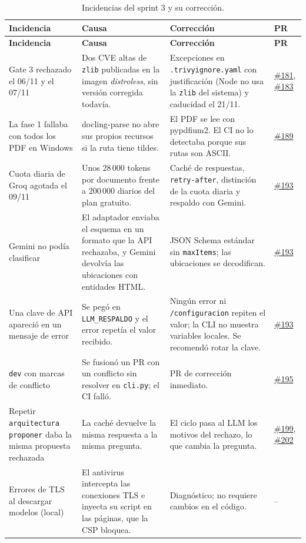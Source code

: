 \documentclass[11pt,a4paper]{report}
\newcommand{\pr}[1]{\href{https://github.com/PracticasESPE/Framework_Desarrollo_Seguro/pull/#1}{\##1}}
\begin{document}
{\small
\begin{longtable}{@{}P{3.3cm}P{4.5cm}P{5.0cm}P{1.2cm}@{}}
\caption{Incidencias del sprint 3 y su corrección.}\\
\toprule
\textbf{Incidencia} & \textbf{Causa} & \textbf{Corrección} & \textbf{PR}\\
\midrule
\endfirsthead
\toprule
\textbf{Incidencia} & \textbf{Causa} & \textbf{Corrección} & \textbf{PR}\\
\midrule
\endhead
Gate 3 rechazado el 06/11 y el 07/11 & Dos CVE altas de \texttt{zlib} publicadas en la imagen \emph{distroless}, sin versión corregida todavía. & Excepciones en \texttt{.trivyignore.yaml} con justificación (Node no usa la \texttt{zlib} del sistema) y caducidad el 21/11. & \pr{181}, \pr{183}\\
La fase 1 fallaba con todos los PDF en Windows & docling-parse no abre sus propios recursos si la ruta tiene tildes. & El PDF se lee con pypdfium2. El CI no lo detectaba porque sus rutas son ASCII. & \pr{189}\\
Cuota diaria de Groq agotada el 09/11 & Unos 28\,000 tokens por documento frente a 200\,000 diarios del plan gratuito. & Caché de respuestas, \texttt{retry-after}, distinción de la cuota diaria y respaldo con Gemini. & \pr{193}\\
Gemini no podía clasificar & El adaptador enviaba el esquema en un formato que la API rechazaba, y Gemini devolvía las ubicaciones con entidades HTML. & JSON Schema estándar sin \texttt{maxItems}; las ubicaciones se decodifican. & \pr{193}\\
Una clave de API apareció en un mensaje de error & Se pegó en \texttt{LLM\_RESPALDO} y el error repetía el valor recibido. & Ningún error ni \texttt{/configuracion} repiten el valor; la CLI no muestra variables locales. Se recomendó rotar la clave. & \pr{193}\\
\texttt{dev} con marcas de conflicto & Se fusionó un PR con un conflicto sin resolver en \texttt{cli.py}; el CI falló. & PR de corrección inmediato. & \pr{195}\\
Repetir \texttt{arquitectura proponer} daba la misma propuesta rechazada & La caché devuelve la misma respuesta a la misma pregunta. & El ciclo pasa al LLM los motivos del rechazo, lo que cambia la pregunta. & \pr{199}, \pr{202}\\
Errores de TLS al descargar modelos (local) & El antivirus intercepta las conexiones TLS e inyecta su script en las páginas, que la CSP bloquea. & Diagnóstico; no requiere cambios en el código. & --\\
\bottomrule
\end{longtable}}
\end{document}
